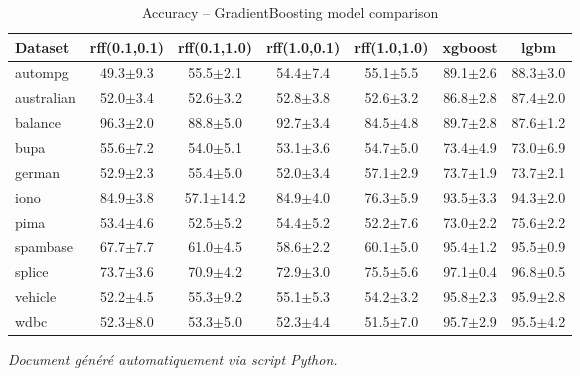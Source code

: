 \documentclass[a4paper,12pt]{article}
\begin{document}
\vspace{1cm}

\centering

\begin{table}
\caption{Accuracy -- GradientBoosting model comparison}
\label{tab:results}
\begin{tabular}{lcccccc}
\toprule
Dataset & rff(0.1,0.1) & rff(0.1,1.0) & rff(1.0,0.1) & rff(1.0,1.0) & xgboost & lgbm \\
\midrule
autompg & 49.3$\pm$9.3 & 55.5$\pm$2.1 & 54.4$\pm$7.4 & 55.1$\pm$5.5 & 89.1$\pm$2.6 & 88.3$\pm$3.0 \\
australian & 52.0$\pm$3.4 & 52.6$\pm$3.2 & 52.8$\pm$3.8 & 52.6$\pm$3.2 & 86.8$\pm$2.8 & 87.4$\pm$2.0 \\
balance & 96.3$\pm$2.0 & 88.8$\pm$5.0 & 92.7$\pm$3.4 & 84.5$\pm$4.8 & 89.7$\pm$2.8 & 87.6$\pm$1.2 \\
bupa & 55.6$\pm$7.2 & 54.0$\pm$5.1 & 53.1$\pm$3.6 & 54.7$\pm$5.0 & 73.4$\pm$4.9 & 73.0$\pm$6.9 \\
german & 52.9$\pm$2.3 & 55.4$\pm$5.0 & 52.0$\pm$3.4 & 57.1$\pm$2.9 & 73.7$\pm$1.9 & 73.7$\pm$2.1 \\
iono & 84.9$\pm$3.8 & 57.1$\pm$14.2 & 84.9$\pm$4.0 & 76.3$\pm$5.9 & 93.5$\pm$3.3 & 94.3$\pm$2.0 \\
pima & 53.4$\pm$4.6 & 52.5$\pm$5.2 & 54.4$\pm$5.2 & 52.2$\pm$7.6 & 73.0$\pm$2.2 & 75.6$\pm$2.2 \\
spambase & 67.7$\pm$7.7 & 61.0$\pm$4.5 & 58.6$\pm$2.2 & 60.1$\pm$5.0 & 95.4$\pm$1.2 & 95.5$\pm$0.9 \\
splice & 73.7$\pm$3.6 & 70.9$\pm$4.2 & 72.9$\pm$3.0 & 75.5$\pm$5.6 & 97.1$\pm$0.4 & 96.8$\pm$0.5 \\
vehicle & 52.2$\pm$4.5 & 55.3$\pm$9.2 & 55.1$\pm$5.3 & 54.2$\pm$3.2 & 95.8$\pm$2.3 & 95.9$\pm$2.8 \\
wdbc & 52.3$\pm$8.0 & 53.3$\pm$5.0 & 52.3$\pm$4.4 & 51.5$\pm$7.0 & 95.7$\pm$2.9 & 95.5$\pm$4.2 \\
\bottomrule
\end{tabular}
\end{table}


\vfill
\begin{center}
    \textit{Document généré automatiquement via script Python.}
\end{center}
\end{document}

